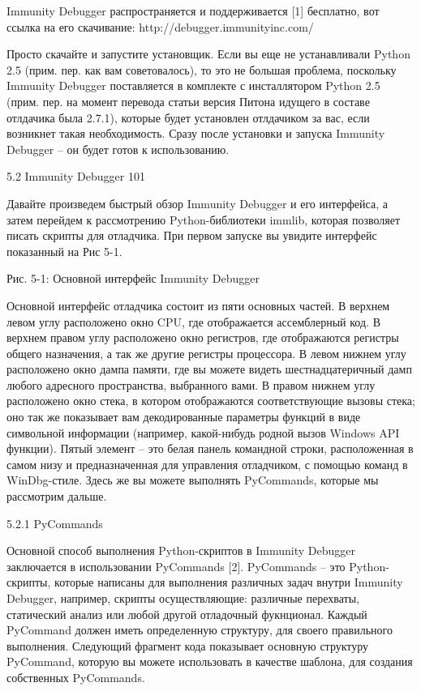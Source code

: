 \documentclass[12pt]{book}
\begin{document}
Immunity Debugger распространяется и поддерживается [1] бесплатно, вот ссылка на его скачивание: http://debugger.immunityinc.com/

Просто скачайте и запустите установщик. Если вы еще не устанавливали Python 2.5 (прим. пер. как вам советовалось), то это не большая проблема, поскольку Immunity Debugger поставляется в комплекте с инсталлятором Python 2.5 (прим. пер. на момент перевода статьи версия Питона идущего в составе отлдачика была 2.7.1), которые будет установлен отлдачиком за вас, если возникнет такая необходимость. Сразу после установки и запуска Immunity Debugger – он будет готов к использованию.


5.2 Immunity Debugger 101

Давайте произведем быстрый обзор Immunity Debugger и его интерфейса, а затем перейдем к рассмотрению Python-библиотеки immlib, которая позволяет писать скрипты для отладчика. При первом запуске вы увидите интерфейс показанный на Рис 5-1.




Рис. 5-1: Основной интерфейс Immunity Debugger

Основной интерфейс отладчика состоит из пяти основных частей. В верхнем левом углу расположено окно CPU, где отображается ассемблерный код. В верхнем правом углу расположено окно регистров, где отображаются регистры общего назначения, а так же другие регистры процессора. В левом нижнем углу расположено окно дампа памяти, где вы можете видеть шестнадцатеричный дамп любого адресного пространства, выбранного вами. В правом нижнем углу расположено окно стека, в котором отображаются соответствующие вызовы стека; оно так же показывает вам декодированные параметры функций в виде символьной информации (например, какой-нибудь родной вызов Windows API функции). Пятый элемент – это белая панель командной строки, расположенная в самом низу и предназначенная для управления отладчиком, с помощью команд в WinDbg-стиле. Здесь же вы можете выполнять PyCommands, которые мы рассмотрим дальше.

5.2.1 PyCommands

Основной способ выполнения Python-скриптов в Immunity Debugger заключается в использовании PyCommands [2]. PyCommands – это Python-скрипты, которые написаны для выполнения различных задач внутри Immunity Debugger, например, скрипты осуществляющие: различные перехваты, статический анализ или любой другой отладочный фукнционал. Каждый PyCommand должен иметь определенную структуру, для своего правильного выполнения. Следующий фрагмент кода показывает основную структуру PyCommand, которую вы можете использовать в качестве шаблона, для создания собственных PyCommands.
\end{document}
